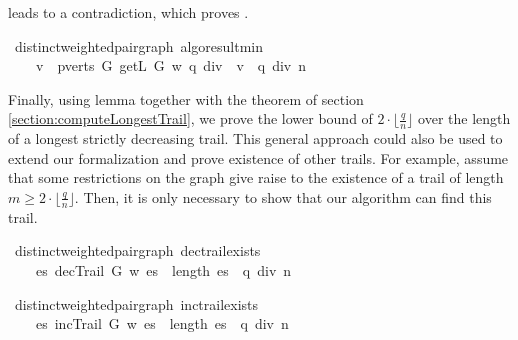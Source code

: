 \begin{isabellebody}
\begin{isamarkuptext}
leads to a contradiction, which proves .%
\end{isamarkuptext}\isamarkuptrue%
\isamarkupfalse%
{\isacharparenleft}\ distinct{\isacharunderscore}weighted{\isacharunderscore}pair{\isacharunderscore}graph{\isacharparenright}\ algo{\isacharunderscore}result{\isacharunderscore}min{\isacharcolon}\ \isanewline
\ \ \ {\isachardoublequoteopen}{\isacharparenleft}{\isasymexists}\ v\ {\isasymin}\ pverts\ G{\isachardot}\ getL\ G\ w\ {\isacharparenleft}q\ div\ {}{\isacharparenright}\ v\ {\isasymge}\ q\ div\ n{\isacharparenright}{\isachardoublequoteclose}%
\isadelimproof
%
\endisadelimproof
%
\isatagproof
%
\endisatagproof
{\isafoldproof}%
%
\isadelimproof
%
\endisadelimproof
%
\begin{isamarkuptext}%
Finally, using lemma  together with the  theorem 
of section \ref{section:computeLongestTrail}, we prove the lower bound of $2\cdot\lfloor \frac{q}{n} \rfloor$ over the length 
of a longest strictly decreasing trail. This general approach could also be used to extend our
formalization and prove existence of other trails. For example, assume that some restrictions on the graph 
give raise to the existence of a trail of length $m \ge 2\cdot\lfloor \frac{q}{n} \rfloor$. Then, it is
only necessary to show that our algorithm can find this trail.%
\end{isamarkuptext}\isamarkuptrue%
\isamarkupfalse%
{\isacharparenleft}\ distinct{\isacharunderscore}weighted{\isacharunderscore}pair{\isacharunderscore}graph{\isacharparenright}\ dec{\isacharunderscore}trail{\isacharunderscore}exists{\isacharcolon}\ \isanewline
\ \ \ {\isachardoublequoteopen}{\isasymexists}\ es{\isachardot}\ decTrail\ G\ w\ es\ {\isasymand}\ length\ es\ {\isacharequal}\ q\ div\ n{\isachardoublequoteclose}%
\isadelimproof
%
\endisadelimproof
%
\isatagproof
%
\endisatagproof
{\isafoldproof}%
%
\isadelimproof
%
\endisadelimproof
%
\begin{isamarkuptext}%
%
\end{isamarkuptext}\isamarkuptrue%
\isamarkupfalse%
{\isacharparenleft}\ distinct{\isacharunderscore}weighted{\isacharunderscore}pair{\isacharunderscore}graph{\isacharparenright}\ inc{\isacharunderscore}trail{\isacharunderscore}exists{\isacharcolon}\ \isanewline
\ \ \ {\isachardoublequoteopen}{\isasymexists}\ es{\isachardot}\ incTrail\ G\ w\ es\ {\isasymand}\ length\ es\ {\isacharequal}\ q\ div\ n{\isachardoublequoteclose}%

\end{isabellebody}
